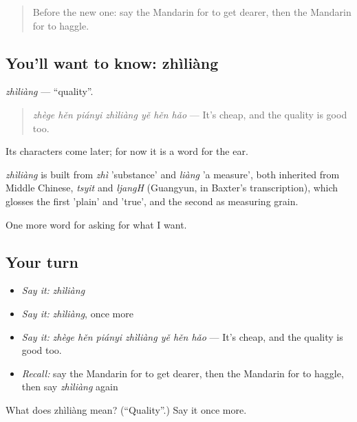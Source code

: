 \begin{quote}
Before the new one: say the Mandarin for to get dearer, then the Mandarin for to haggle.
\end{quote}

\subsection*{You'll want to know: zhìliàng}
\emph{zhìliàng} — \textquotedblleft{}quality\textquotedblright{}.

\begin{quote}
\emph{zhège hěn piányi zhìliàng yě hěn hǎo} — It's cheap, and the quality is good too.
\end{quote}

Its characters come later; for now it is a word for the ear.

\begin{cousinweb}
\emph{zhìliàng} is built from \emph{zhì} 'substance' and \emph{liàng} 'a measure', both inherited from Middle Chinese, \emph{tsyit} and \emph{ljangH} (Guangyun, in Baxter's transcription), which glosses the first 'plain' and 'true', and the second as measuring grain.
\end{cousinweb}

\begin{grammarlens}[title={What you've built}]
One more word for asking for what I want.
\end{grammarlens}

\subsection*{Your turn}
\begin{itemize}
\raggedright
  \item \emph{Say it:} \emph{zhìliàng}
  \item \emph{Say it:} \emph{zhìliàng}, once more
  \item \emph{Say it:} \emph{zhège hěn piányi zhìliàng yě hěn hǎo} — It's cheap, and the quality is good too.
  \item \emph{Recall:} say the Mandarin for to get dearer, then the Mandarin for to haggle, then say \emph{zhìliàng} again
\end{itemize}

\begin{tcolorbox}[breakable,colback=teal!4,colframe=teal!35!black,title={Before you move on}]
What does zhìliàng mean? (\textquotedblleft{}Quality\textquotedblright{}.) Say it once more.
\end{tcolorbox}
